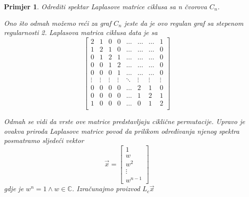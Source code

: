 \documentclass[11pt]{article}
\newtheorem{example}{Primjer}
\begin{document}
	\begin{example}
		Odrediti spektar Laplasove matrice ciklusa sa n čvorova $C_n$.
	
		Ono što odmah možemo reći za graf $C_n$ jeste da je ovo regulan graf sa stepenom regularnosti 2. 
	Laplasova matrica ciklusa data je sa 
	\[
	\begin{bmatrix}
	
	2 & 1 & 0 & 0 & \dots & \dots & \dots & 1 \\
	1 & 2 & 1 & 0 & \dots & \dots & \dots & 0 \\
	0 & 1 & 2 & 1 & \dots & \dots & \dots & 0 \\
	0 & 0 & 1 & 2 & \dots & \dots & \dots & 0 \\
	0 & 0 & 0 & 1 & \dots & \dots & \dots & 0 \\
	\vdots  & \vdots  & \vdots  & \vdots  & \ddots & \vdots & \vdots & \vdots  \\
	0 & 0 & 0 & 0 & \dots & 2 & 1 & 0 \\
	0 & 0 & 0 & 0 & \dots & 1 & 2 & 1 \\
	1 & 0 & 0 & 0 & \dots & 0 & 1 & 2 \\
	\end{bmatrix}
	\]
	
	Odmah se vidi da vrste ove matrice predstavljaju ciklične permutacije.
	Upravo je ovakva priroda Laplasove matrice povod da prilikom određivanja njenog spektra posmatramo sljedeći vektor 
	\[ \vec{x} =
	\begin{bmatrix}
	1 \\
	w \\
	w^2\\
	\vdots \\
	w^{n-1}
	\end{bmatrix}
	\]
	gdje je $w^n = 1 \land w \in \mathbb{C}$. Izračunajmo proizvod $L_c \vec{x}$


\end{example}
\end{document}
